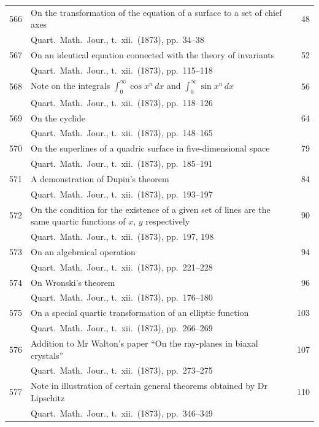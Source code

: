 \documentclass[11pt,a4paper]{book}
\begin{document}
\begin{longtable}{r @{. } p{4.8in} r}
566 & On the transformation of the equation of a surface to a set of chief axes & 48 \\
  & Quart.\ Math.\ Jour., t.\ xii.\ (1873), pp.\ 34--38 & \\ 

567 & On an identical equation connected with the theory of invariants & 52 \\
  & Quart.\ Math.\ Jour., t.\ xii.\ (1873), pp.\ 115--118 & \\ 

568 & Note on the integrals $\displaystyle\int_0^\infty \cos x^n \,dx$ and $\displaystyle\int_0^\infty \sin x^n \,dx$ & 56 \\
  & Quart.\ Math.\ Jour., t.\ xii.\ (1873), pp.\ 118--126 & \\ 

569 & On the cyclide & 64 \\
  & Quart.\ Math.\ Jour., t.\ xii.\ (1873), pp.\ 148--165 & \\ 

570 & On the superlines of a quadric surface in five-dimensional space & 79 \\
  & Quart.\ Math.\ Jour., t.\ xii.\ (1873), pp.\ 185--191 & \\ 

571 & A demonstration of Dupin's theorem & 84 \\
  & Quart.\ Math.\ Jour., t.\ xii.\ (1873), pp.\ 193--197 & \\ 

572 & On the condition for the existence of a given set of lines are the same quartic functions of $x$, $y$ respectively & 90 \\
  & Quart.\ Math.\ Jour., t.\ xii.\ (1873), pp.\ 197, 198 & \\ 

573 & On an algebraical operation & 94 \\
  & Quart.\ Math.\ Jour., t.\ xii.\ (1873), pp.\ 221--228 & \\ 

574 & On Wronski's theorem & 96 \\
  & Quart.\ Math.\ Jour., t.\ xii.\ (1873), pp.\ 176--180 & \\ 

575 & On a special quartic transformation of an elliptic function & 103 \\
  & Quart.\ Math.\ Jour., t.\ xii.\ (1873), pp.\ 266--269 & \\ 

576 & Addition to Mr Walton's paper ``On the ray-planes in biaxal crystals'' & 107 \\
  & Quart.\ Math.\ Jour., t.\ xii.\ (1873), pp.\ 273--275 & \\ 

577 & Note in illustration of certain general theorems obtained by Dr Lipschitz & 110 \\
  & Quart.\ Math.\ Jour., t.\ xii.\ (1873), pp.\ 346--349 & \\ 
\end{longtable}
\end{document}
